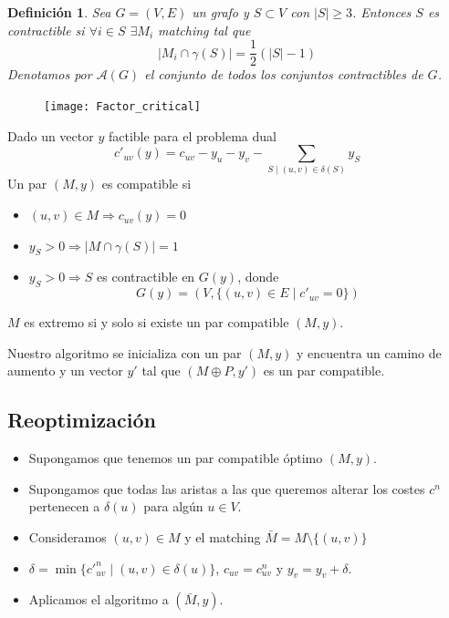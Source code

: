 \documentclass{beamer}
\newtheorem{defi}{Definici\'on}[section]
\begin{document}
\begin{frame}
\begin{defi}
Sea $G=(V,E)$ un grafo y $S\subset V$ con $|S|\geq 3$. Entonces $S$ es contractible si $\forall i \in S$ $\exists M_i$ matching tal que 
$$
|M_i\cap \gamma(S)| = \frac{1}{2}(|S|-1)
$$
Denotamos por $\mathcal{A}(G)$ el conjunto de todos los conjuntos contractibles de $G$.
\end{defi}
\end{frame}

\begin{frame}
\begin{figure}[h!]
\centering
\texttt{[image: Factor\_critical]}
\end{figure}
\end{frame}

\begin{frame}
Dado un vector $y$ factible para el problema dual
$$
c'_{uv}(y) = c_{uv}- y_u-y_v - \sum_{S\mid (u,v)\in \delta(S)} y_S
$$
Un par $(M,y)$ es compatible si 
\begin{itemize}
\item $(u,v)\in M \Rightarrow c_{uv}(y) = 0$
\item $y_S >0  \Rightarrow |M\cap \gamma(S)| =1$
\item $y_S > 0 \Rightarrow S$ es contractible en $G(y)$, donde
$$ G(y) = (V,\{(u,v)\in E \mid c'_{uv}=0\})$$
\end{itemize}
\end{frame}

\begin{frame}
\begin{theorem}
$M$ es extremo si y solo si existe un par compatible $(M,y)$.
\end{theorem}
Nuestro algoritmo se inicializa con un par $(M,y)$ y encuentra un camino de aumento y un vector $y'$ tal que $(M\oplus P,y')$ es un par compatible.
\end{frame}
\subsection{Reoptimización}
\begin{frame}
\begin{itemize}
\item Supongamos que tenemos un par compatible óptimo $(M,y)$. 
\item Supongamos que todas las aristas a las que queremos alterar los costes $c^n$ pertenecen a $ \delta(u)$ para algún $u \in V$.
\item Consideramos $(u,v) \in M$ y el matching $\bar{M} = M\setminus\{(u,v)\}$
\item $\delta  = \min\{c'^n_{uv} \mid (u,v) \in \delta (u)\}$, $c_{uv} = c^n_{uv}$ y $y_v=y_v + \delta$.
\item Aplicamos el algoritmo a $(\bar{M},y)$.
\end{itemize}
\end{frame}
\end{document}
